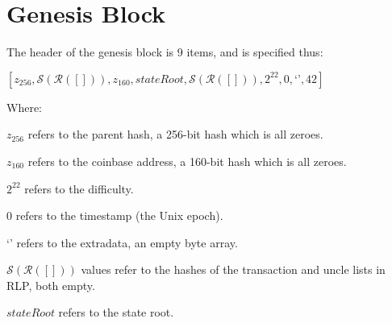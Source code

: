 \documentclass[9pt,oneside]{amsart}
\begin{document}
\section{Genesis Block}\label{app:genesis}

The header of the genesis block is 9 items, and is specified thus:

$[z_{256}, \mathcal{S}(\mathcal{R}([])), z_{160}, stateRoot, \mathcal{S}(\mathcal{R}([])), 2^{22}, 0, \text{`'}, 42]$

Where:

$z_{256}$ refers to the parent hash, a 256-bit hash which is all zeroes.

$z_{160}$ refers to the coinbase address, a 160-bit hash which is all zeroes.

$2^{22}$ refers to the difficulty.

0 refers to the timestamp (the Unix epoch).

`' refers to the extradata, an empty byte array.

$\mathcal{S}(\mathcal{R}([]))$ values refer to the hashes of the transaction and uncle lists in RLP, both empty.

$stateRoot$ refers to the state root.
\end{document}
